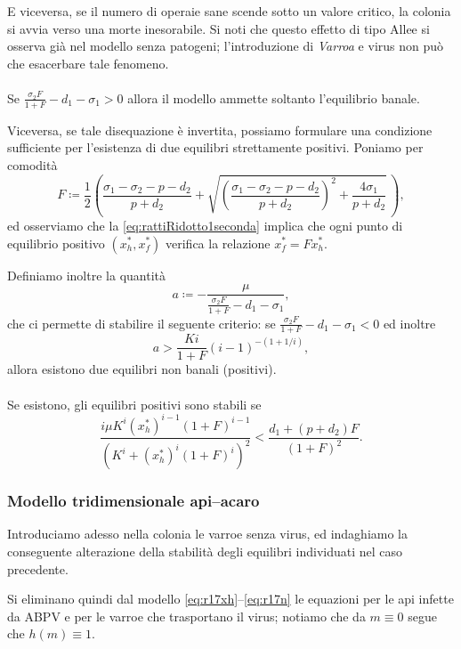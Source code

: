 E viceversa, se il numero di operaie sane scende sotto un valore critico, la colonia si avvia verso una morte inesorabile.
Si noti che questo effetto di tipo Allee si osserva già nel modello senza patogeni; l'introduzione di \emph{Varroa} e virus non può che esacerbare tale fenomeno.

\paragraph{}
Se $\frac{\sigma_2 F}{1+F} - d_1 - \sigma_1 >0$ allora il modello ammette soltanto l'equilibrio banale.

Viceversa, se tale disequazione è invertita, possiamo formulare una condizione sufficiente per l'esistenza di due equilibri strettamente positivi.
Poniamo per comodità
$$
    F \coloneq \frac{1}{2} \left( \frac{ \sigma_1 - \sigma_2 - p - d_2 }{p+d_2} +
    \sqrt{ {\left( \frac{ \sigma_1 - \sigma_2 - p - d_2 }{p+d_2} \right)}^2 + \frac{4 \sigma_1}{p+d_2} } \, \right),
$$
ed osserviamo che la \eqref{eq:rattiRidotto1seconda} implica che ogni punto di equilibrio positivo $(x_h^*, x_f^*)$ verifica la relazione $x_f^* = F x_h^*$.

Definiamo inoltre la quantità
$$ a \coloneq - \frac{ \mu }{ \frac{\sigma_2 F}{1+F} - d_1 - \sigma_1 }, $$
che ci permette di stabilire il seguente criterio: se $\frac{\sigma_2 F}{1+F} - d_1 - \sigma_1 <0$ ed inoltre
$$a > \frac{Ki}{1+F} (i-1)^{- (1+ 1/i)},$$
allora esistono due equilibri non banali (positivi).

\paragraph{}
Se esistono, gli equilibri positivi sono stabili se
\begin{equation}
\frac{i \mu K^i {(x_h^*)}^{i-1} {(1+F)}^{i-1}}{ {\left( K^i + {(x_h^*)}^i {(1+F)}^i \right)}^2 }
<
\frac{d_1 + (p+d_2) F}{{(1+F)}^2}.
\label{eq:rattiRidotto1stability}
\end{equation}

\subsubsection{Modello tridimensionale api--acaro}
Introduciamo adesso nella colonia le varroe senza virus, ed indaghiamo la conseguente alterazione della stabilità degli equilibri individuati nel caso precedente.

Si eliminano quindi dal modello \eqref{eq:r17xh}--\eqref{eq:r17n} le equazioni per le api infette da ABPV e per le varroe che trasportano il virus; notiamo che da $m \equiv 0$ segue che $h(m) \equiv 1$.

